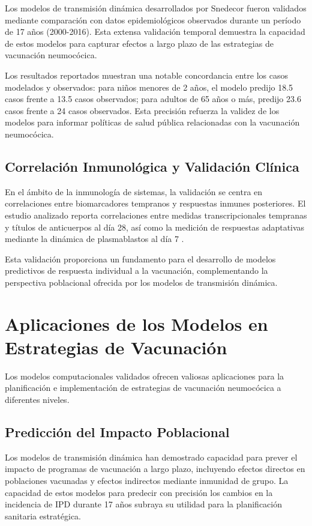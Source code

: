 Los modelos de transmisión dinámica desarrollados por Snedecor \cite{Snedecor2020a,Snedecor2020b} fueron validados mediante comparación con datos epidemiológicos observados durante un período de 17 años (2000-2016). Esta extensa validación temporal demuestra la capacidad de estos modelos para capturar efectos a largo plazo de las estrategias de vacunación neumocócica.

Los resultados reportados muestran una notable concordancia entre los casos modelados y observados: para niños menores de 2 años, el modelo predijo 18.5 casos frente a 13.5 casos observados; para adultos de 65 años o más, predijo 23.6 casos frente a 24 casos observados. Esta precisión refuerza la validez de los modelos para informar políticas de salud pública relacionadas con la vacunación neumocócica.

\subsection{Correlación Inmunológica y Validación Clínica}

En el ámbito de la inmunología de sistemas, la validación se centra en correlaciones entre biomarcadores tempranos y respuestas inmunes posteriores. El estudio analizado reporta correlaciones entre medidas transcripcionales tempranas y títulos de anticuerpos al día 28, así como la medición de respuestas adaptativas mediante la dinámica de plasmablastos al día 7 \cite{Obermoser2013}.

Esta validación proporciona un fundamento para el desarrollo de modelos predictivos de respuesta individual a la vacunación, complementando la perspectiva poblacional ofrecida por los modelos de transmisión dinámica.

\section{Aplicaciones de los Modelos en Estrategias de Vacunación}

Los modelos computacionales validados ofrecen valiosas aplicaciones para la planificación e implementación de estrategias de vacunación neumocócica a diferentes niveles.

\subsection{Predicción del Impacto Poblacional}

Los modelos de transmisión dinámica han demostrado capacidad para prever el impacto de programas de vacunación a largo plazo, incluyendo efectos directos en poblaciones vacunadas y efectos indirectos mediante inmunidad de grupo. La capacidad de estos modelos para predecir con precisión los cambios en la incidencia de IPD durante 17 años subraya su utilidad para la planificación sanitaria estratégica.

